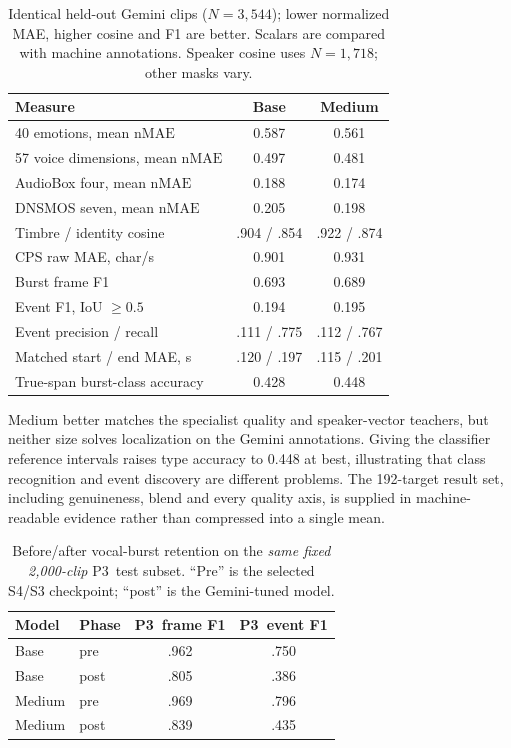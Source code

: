 \documentclass{article}
\newcommand{\pthree}{\textsc{P3}}
\newcommand{\nmae}{\mathrm{nMAE}}
\begin{document}
\begin{table}[t]
\centering\small
\caption{Identical held-out Gemini clips ($N=3{,}544$); lower normalized MAE, higher cosine and F1 are better. Scalars are compared with machine annotations. Speaker cosine uses $N=1{,}718$; other masks vary.}
\label{tab:teacher}
\begin{tabular}{@{}lcc@{}}\toprule
Measure & Base & Medium \\\midrule
40 emotions, mean $\nmae$ & 0.587 & 0.561 \\
57 voice dimensions, mean $\nmae$ & 0.497 & 0.481 \\
AudioBox four, mean $\nmae$ & 0.188 & 0.174 \\
DNSMOS seven, mean $\nmae$ & 0.205 & 0.198 \\
Timbre / identity cosine & .904 / .854 & .922 / .874 \\
CPS raw MAE, char/s & 0.901 & 0.931 \\
Burst frame F1 & 0.693 & 0.689 \\
Event F1, IoU $\geq0.5$ & 0.194 & 0.195 \\
Event precision / recall & .111 / .775 & .112 / .767 \\
Matched start / end MAE, s & .120 / .197 & .115 / .201 \\
True-span burst-class accuracy & 0.428 & 0.448 \\
\bottomrule\end{tabular}
\end{table}

Medium better matches the specialist quality and speaker-vector teachers, but neither size solves localization on the Gemini annotations. Giving the classifier reference intervals raises type accuracy to 0.448 at best, illustrating that class recognition and event discovery are different problems. The 192-target result set, including genuineness, blend and every quality axis, is supplied in machine-readable evidence rather than compressed into a single mean.

\begin{table}[t]
\centering\small
\caption{Before/after vocal-burst retention on the \emph{same fixed 2,000-clip} \pthree\ test subset. ``Pre'' is the selected S4/S3 checkpoint; ``post'' is the Gemini-tuned model.}
\label{tab:burst}
\begin{tabular}{@{}llcc@{}}\toprule
Model & Phase & \pthree\ frame F1 & \pthree\ event F1 \\\midrule
Base & pre & .962 & .750 \\
Base & post & .805 & .386 \\
Medium & pre & .969 & .796 \\
Medium & post & .839 & .435 \\
\bottomrule\end{tabular}
\end{table}
\end{document}
